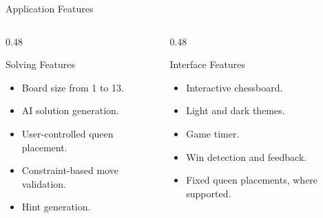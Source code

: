\documentclass[aspectratio=169,12pt]{beamer}
\begin{document}
\begin{frame}{Application Features}

\begin{columns}[T,totalwidth=\textwidth]

\begin{column}{0.48\textwidth}

\begin{block}{Solving Features}

\begin{itemize}
    \item Board size from 1 to 13.
    \item AI solution generation.
    \item User-controlled queen placement.
    \item Constraint-based move validation.
    \item Hint generation.
\end{itemize}

\end{block}

\end{column}

\begin{column}{0.48\textwidth}

\begin{block}{Interface Features}

\begin{itemize}
    \item Interactive chessboard.
    \item Light and dark themes.
    \item Game timer.
    \item Win detection and feedback.
    \item Fixed queen placements, where supported.
\end{itemize}

\end{block}

\end{column}

\end{columns}

\end{frame}

\end{document}
